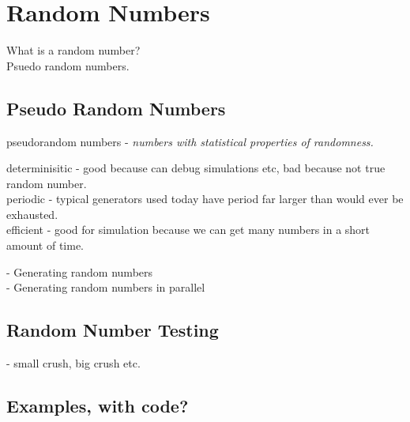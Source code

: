 
\chapter{Random Numbers} \label{app:randomNumbers}

What is a random number?\\
Psuedo random numbers.\\

\section{Pseudo Random Numbers} \label{app:pseudoRand}

pseudorandom numbers - \emph{numbers with statistical properties of randomness.}

determinisitic - good because can debug simulations etc, bad because not true random number.\\
periodic - typical generators  used today have period far larger than would ever be exhausted.\\
efficient - good for simulation because we can get many numbers in a short amount of time.

- Generating random numbers\\
- Generating random numbers in parallel

\section{Random Number Testing} \label{app:randTest}

- small crush, big crush etc.

\section{Examples, with code?}